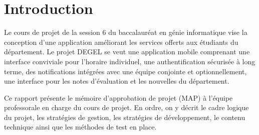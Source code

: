 \section{Introduction}
Le cours de projet de la session 6 du baccalauréat en génie informatique vise la conception d'une application améliorant les services offerts aux étudiants du département. Le projet DEGEL se veut une application mobile comprenant une interface conviviale pour l'horaire individuel, une authentification sécurisée à long terme, des notifications intégrées avec une équipe conjointe et optionnellement, une interface pour les notes d'évaluation et les nouvelles du département.

Ce rapport présente le mémoire d'approbation de projet (MAP) à l'équipe professorale en charge du cours de projet. En ordre, on y décrit le cadre logique du projet, les stratégies de gestion, les stratégies de développement, le contenu technique ainsi que les méthodes de test en place.